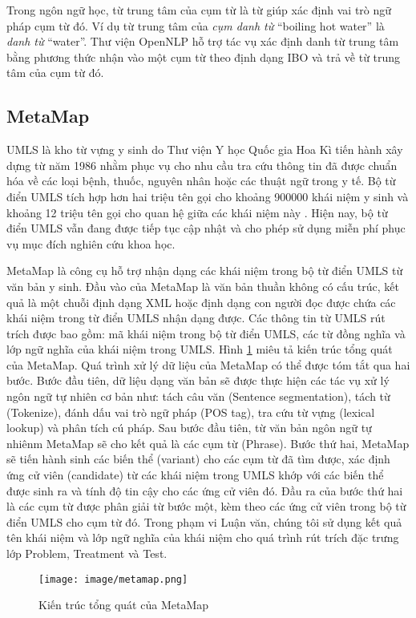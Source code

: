 Trong ngôn ngữ học, từ trung tâm của cụm từ là từ giúp xác định vai trò ngữ pháp cụm từ đó. Ví dụ từ trung tâm của \textit{cụm danh từ} ``boiling hot water'' là \textit{danh từ} ``water''. Thư viện OpenNLP hỗ trợ tác vụ xác định danh từ trung tâm bằng phương thức nhận vào một cụm từ theo định dạng IBO và trả về từ trung tâm của cụm từ đó.

\subsection*{MetaMap}
UMLS là kho từ vựng y sinh do Thư viện Y học Quốc gia Hoa Kì tiến hành xây dựng từ năm 1986 nhằm phục vụ cho nhu cầu tra cứu thông tin đã được chuẩn hóa về các loại bệnh, thuốc, nguyên nhân hoặc các thuật ngữ trong y tế. Bộ từ điển UMLS tích hợp hơn hai triệu tên gọi cho khoảng 900000 khái niệm y sinh và khoảng 12 triệu tên gọi cho quan hệ giữa các khái niệm này \cite{Olivier2004}. Hiện nay, bộ từ điển UMLS vẫn đang được tiếp tục cập nhật và cho phép sử dụng miễn phí phục vụ mục đích nghiên cứu khoa học.

MetaMap là công cụ hỗ trợ nhận dạng các khái niệm trong bộ từ điển UMLS từ văn bản y sinh. Đầu vào của MetaMap là văn bản thuần không có cấu trúc, kết quả là một chuỗi định dạng XML hoặc định dạng con người đọc được chứa các khái niệm trong từ điển UMLS nhận dạng được. Các thông tin từ UMLS rút trích được bao gồm: mã khái niệm trong bộ từ điển UMLS, các từ đồng nghĩa và lớp ngữ nghĩa của khái niệm trong UMLS. Hình \ref{metamapstructure} miêu tả kiến trúc tổng quát của MetaMap. Quá trình xử lý dữ liệu của MetaMap có thể được tóm tắt qua hai bước. Bước đầu tiên, dữ liệu dạng văn bản sẽ được thực hiện các tác vụ xử lý ngôn ngữ tự nhiên cơ bản như: tách câu văn (Sentence segmentation), tách từ (Tokenize), đánh dấu vai trò ngữ pháp (POS tag), tra cứu từ vựng (lexical lookup) và phân tích cú pháp. Sau bước đầu tiên, từ văn bản ngôn ngữ tự nhiênm MetaMap sẽ cho kết quả là các cụm từ (Phrase). Bước thứ hai, MetaMap sẽ tiến hành sinh các biến thể (variant) cho các cụm từ đã tìm được, xác định ứng cử viên (candidate) từ các khái niệm trong UMLS khớp với các biến thể được sinh ra và tính độ tin cậy cho các ứng cử viên đó. Đầu ra của bước thứ hai là các cụm từ được phân giải từ bước một, kèm theo các ứng cử viên trong bộ từ điển UMLS cho cụm từ đó. Trong phạm vi Luận văn, chúng tôi sử dụng kết quả tên khái niệm và lớp ngữ nghĩa của khái niệm cho quá trình rút trích đặc trưng lớp Problem, Treatment và Test.

\begin{figure}
\centering
\texttt{[image: image/metamap.png]}
\caption{Kiến trúc tổng quát của MetaMap\label{metamapstructure}}
\end{figure}

